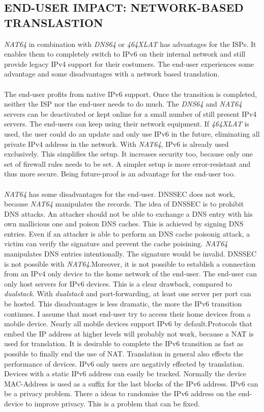 \documentclass[format=sigconf, natbib=true, nonacm=true]{acmart}
\begin{document}
    \subsection*{END-USER IMPACT: NETWORK-BASED TRANSLASTION}
    \textit{NAT64} in combination with \textit{DNS64} or \textit{464XLAT} has advantages for the ISPs. It enables them to completely switch to IPv6 on their internal network and still provide legacy IPv4 support for their costumers. The end-user experiences some advantage and some disadvantages with a network based translation.\\\\The end-user profits from native IPv6 support. Once the transition is completed, neither the ISP nor the end-user needs to do much. The \textit{DNS64} and \textit{NAT64} servers can be deactivated or kept online for a small number of still present IPv4 servers. The end-users can keep using their network equipment. If \textit{464XLAT} is used, the user could do an update and only use IPv6 in the future, eliminating all private IPv4 address in the network. With \textit{NAT64}, IPv6 is already used exclusively. This simplifies the setup. It increases security too, because only one set of firewall rules needs to be set. A simpler setup is more error-resistant and thus more secure. Being future-proof is an advantage for the end-user too.\\\\\textit{NAT64} has some disadvantages for the end-user. DNSSEC does not work, because \textit{NAT64} manipulates the records. The idea of DNSSEC is to prohibit DNS attacks. An attacker should not be able to exchange a DNS entry with his own mallicious one and poison DNS caches. This is achieved by signing DNS entries. Even if an attacker is able to perform an DNS cache poisonig attack, a victim can verify the signature and prevent the cache poisining. \textit{NAT64} manipulates DNS entries intentionally. The signature would be invalid. DNSSEC is not possible with \textit{NAT64}.Moreover, it is not possible to establish a connection from an IPv4 only device to the home network of the end-user. The end-user can only host servers for IPv6 devices. This is a clear drawback, compared to \textit{dualstack}. With \textit{dualstack} and port-forwarding, at least one server per port can be hosted. This disadvantages is less dramatic, the more the IPv6 transition continues. I assume that most end-user try to access their home devices from a mobile device. Nearly all mobile devices support IPv6 by default.Protocols that embed the IP address at higher levels will probably not work, because a NAT is used for translation. It is desirable to complete the IPv6 transition as fast as possible to finally end the use of NAT. Translation in general also effects the performance of devices. IPv6 only users are negativly effected by translation\cite{10.1109/TNET.2015.2453338}. Devices with a static IPv6 address can easily be tracked. Normally the device MAC-Address is used as a suffix for the last blocks of the IPv6 address. IPv6 can be a privacy problem. There a ideas to randomise the IPv6 address on the end-device to improve privacy. This is a problem that can be fixed.
\end{document}
